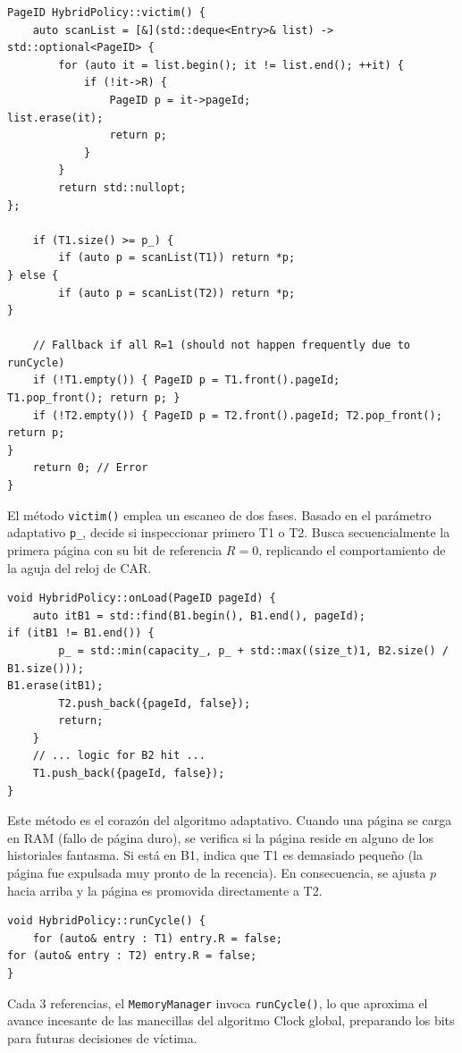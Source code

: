 \documentclass[12pt,letterpaper]{article}
\begin{document}
\begin{tcolorbox}[codebox, title={HybridPolicy::victim() --- Selección de víctima}]
\begin{lstlisting}
PageID HybridPolicy::victim() {
    auto scanList = [&](std::deque<Entry>& list) -> std::optional<PageID> {
        for (auto it = list.begin(); it != list.end(); ++it) {
            if (!it->R) {
                PageID p = it->pageId;
list.erase(it);
                return p;
            }
        }
        return std::nullopt;
};

    if (T1.size() >= p_) {
        if (auto p = scanList(T1)) return *p;
} else {
        if (auto p = scanList(T2)) return *p;
}

    // Fallback if all R=1 (should not happen frequently due to runCycle)
    if (!T1.empty()) { PageID p = T1.front().pageId;
T1.pop_front(); return p; }
    if (!T2.empty()) { PageID p = T2.front().pageId; T2.pop_front(); return p;
}
    return 0; // Error
}
\end{lstlisting}
\end{tcolorbox}
El método \texttt{victim()} emplea un escaneo de dos fases.
Basado en el parámetro adaptativo \texttt{p\_}, decide si inspeccionar primero T1 o T2.
Busca secuencialmente la primera página con su bit de referencia $R=0$, replicando el comportamiento de la aguja del reloj de CAR.
\begin{tcolorbox}[codebox, title={HybridPolicy::onLoad() --- Adaptación Dinámica}]
\begin{lstlisting}
void HybridPolicy::onLoad(PageID pageId) {
    auto itB1 = std::find(B1.begin(), B1.end(), pageId);
if (itB1 != B1.end()) {
        p_ = std::min(capacity_, p_ + std::max((size_t)1, B2.size() / B1.size()));
B1.erase(itB1);
        T2.push_back({pageId, false});
        return;
    }
    // ... logic for B2 hit ...
    T1.push_back({pageId, false});
}
\end{lstlisting}
\end{tcolorbox}
Este método es el corazón del algoritmo adaptativo. Cuando una página se carga en RAM (fallo de página duro), se verifica si la página reside en alguno de los historiales fantasma.
Si está en B1, indica que T1 es demasiado pequeño (la página fue expulsada muy pronto de la recencia).
En consecuencia, se ajusta $p$ hacia arriba y la página es promovida directamente a T2.
\begin{tcolorbox}[codebox, title={HybridPolicy::runCycle() --- Reset periódico}]
\begin{lstlisting}
void HybridPolicy::runCycle() {
    for (auto& entry : T1) entry.R = false;
for (auto& entry : T2) entry.R = false;
}
\end{lstlisting}
\end{tcolorbox}
Cada 3 referencias, el \texttt{MemoryManager} invoca \texttt{runCycle()}, lo que aproxima el avance incesante de las manecillas del algoritmo Clock global, preparando los bits para futuras decisiones de víctima.
\end{document}
